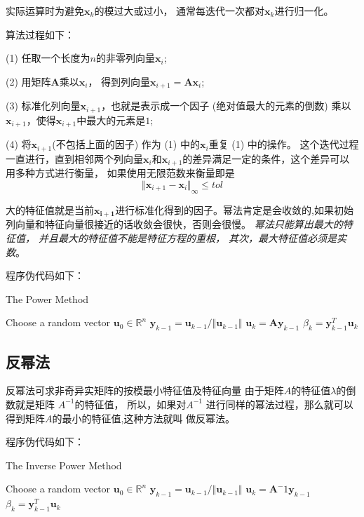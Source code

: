 实际运算时为避免$\bm{x}_k$的模过大或过小，
通常每迭代一次都对$\bm{x}_k$进行归一化。

算法过程如下：

(1) 任取一个长度为$n$的非零列向量$\bm{x}_i$;

(2) 用矩阵$\bm{A}$乘以$\bm{x}_i$，
得到列向量$\bm{x}_{i+1}=\bm{A}\bm{x}_i$;

(3) 标准化列向量$\bm{x}_{i+1}$，也就是表示成一个因子 (绝对值最大的元素的倒数) 乘以$\bm{x}_{i+1}$，使得$\bm{x}_{i+1}$中最大的元素是$1$;

(4) 将$\bm{x}_{i+1}$(不包括上面的因子) 作为 (1) 中的$\bm{x}_i$重复 (1) 中的操作。
这个迭代过程一直进行，直到相邻两个列向量$\bm{x}_{i}$和$\bm{x}_{i+1}$的差异满足一定的条件，这个差异可以用多种方式进行衡量，
如果使用无限范数来衡量即是
\[{\Vert \bm{x}_{i+1}-\bm{x}_i\Vert}_\infty \le tol\]

大的特征值就是当前$\bm{x_{i+1}}$进行标准化得到的因子。幂法肯定是会收敛的,如果初始列向量和特征向量很接近的话收敛会很快，否则会很慢。
\textit{幂法只能算出最大的特征值，
并且最大的特征值不能是特征方程的重根，
其次，最大特征值必须是实数}。

程序伪代码如下：
\begin{algorithm}
  \caption{The Power Method}
  \label{alg1}
  \begin{algorithmic}[1]
 	\STATE Choose a random vector $\bm{u}_{0}\in \mathbb{R}^{n}$
  \STATE $\bm{y}_{k-1}=\bm{u}_{k-1}/\Vert \bm{u}_{k-1}\Vert$
  \STATE $\bm{u}_{k}=\bm{A}\bm{y}_{k-1}$
  \STATE $\beta_{k}=\bm{y}_{k-1}^{T}\bm{u}_{k}$
  \ENDWHILE
  \end{algorithmic}
\end{algorithm}

\newpage
\subsection{反幂法}
反幂法可求非奇异实矩阵的按模最小特征值及特征向量
由于矩阵$A$的特征值$\lambda$的倒数就是矩阵
$A^{-1}$的特征值，
所以，如果对$A^{-1}$
进行同样的幂法过程，那么就可以得到矩阵$A$的最小的特征值,这种方法就叫
做反幂法。

程序伪代码如下：
\begin{algorithm}
  \caption{The Inverse Power Method}
  \label{alg2}
  \begin{algorithmic}[1]
 	\STATE Choose a random vector $\bm{u}_{0}\in \mathbb{R}^{n}$
  \STATE $\bm{y}_{k-1}=\bm{u}_{k-1}/\Vert \bm{u}_{k-1}\Vert$
  \STATE $\bm{u}_{k}=\bm{A}^-1\bm{y}_{k-1}$
  \STATE $\beta_{k}=\bm{y}_{k-1}^{T}\bm{u}_{k}$
  \ENDWHILE
  \end{algorithmic}
\end{algorithm}

